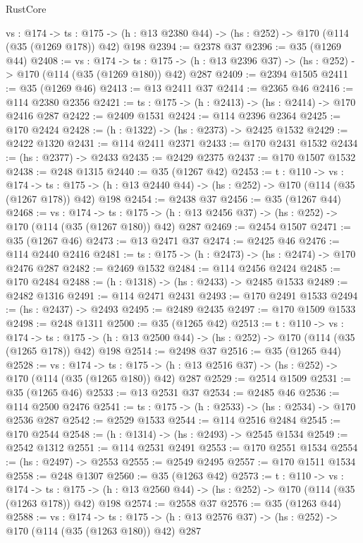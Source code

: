 \begin{lexlean}{RustCore}
\begin{coremodule}
  {vs : @174} ->
  {ts : @175} -> (h : @13 @2380 @44) -> (hs : @252) -> @170 (@114 (@35 (@1269 @178)) @42) @198
@2394 := @2378 @37
@2396 := @35 (@1269 @44)
@2408 := {vs : @174} ->
  {ts : @175} -> (h : @13 @2396 @37) -> (hs : @252) -> @170 (@114 (@35 (@1269 @180)) @42) @287
@2409 := @2394 @1505
@2411 := @35 (@1269 @46)
@2413 := @13 @2411 @37
@2414 := @2365 @46
@2416 := @114 @2380 @2356
@2421 := {ts : @175} -> (h : @2413) -> (hs : @2414) -> @170 @2416 @287
@2422 := @2409 @1531
@2424 := @114 @2396 @2364
@2425 := @170 @2424
@2428 := (h : @1322) -> (hs : @2373) -> @2425 @1532
@2429 := @2422 @1320
@2431 := @114 @2411 @2371
@2433 := @170 @2431 @1532
@2434 := (hs : @2377) -> @2433
@2435 := @2429 @2375
@2437 := @170 @1507 @1532
@2438 := @248 @1315
@2440 := @35 (@1267 @42)
@2453 := {t : @110} ->
  {vs : @174} ->
  {ts : @175} -> (h : @13 @2440 @44) -> (hs : @252) -> @170 (@114 (@35 (@1267 @178)) @42) @198
@2454 := @2438 @37
@2456 := @35 (@1267 @44)
@2468 := {vs : @174} ->
  {ts : @175} -> (h : @13 @2456 @37) -> (hs : @252) -> @170 (@114 (@35 (@1267 @180)) @42) @287
@2469 := @2454 @1507
@2471 := @35 (@1267 @46)
@2473 := @13 @2471 @37
@2474 := @2425 @46
@2476 := @114 @2440 @2416
@2481 := {ts : @175} -> (h : @2473) -> (hs : @2474) -> @170 @2476 @287
@2482 := @2469 @1532
@2484 := @114 @2456 @2424
@2485 := @170 @2484
@2488 := (h : @1318) -> (hs : @2433) -> @2485 @1533
@2489 := @2482 @1316
@2491 := @114 @2471 @2431
@2493 := @170 @2491 @1533
@2494 := (hs : @2437) -> @2493
@2495 := @2489 @2435
@2497 := @170 @1509 @1533
@2498 := @248 @1311
@2500 := @35 (@1265 @42)
@2513 := {t : @110} ->
  {vs : @174} ->
  {ts : @175} -> (h : @13 @2500 @44) -> (hs : @252) -> @170 (@114 (@35 (@1265 @178)) @42) @198
@2514 := @2498 @37
@2516 := @35 (@1265 @44)
@2528 := {vs : @174} ->
  {ts : @175} -> (h : @13 @2516 @37) -> (hs : @252) -> @170 (@114 (@35 (@1265 @180)) @42) @287
@2529 := @2514 @1509
@2531 := @35 (@1265 @46)
@2533 := @13 @2531 @37
@2534 := @2485 @46
@2536 := @114 @2500 @2476
@2541 := {ts : @175} -> (h : @2533) -> (hs : @2534) -> @170 @2536 @287
@2542 := @2529 @1533
@2544 := @114 @2516 @2484
@2545 := @170 @2544
@2548 := (h : @1314) -> (hs : @2493) -> @2545 @1534
@2549 := @2542 @1312
@2551 := @114 @2531 @2491
@2553 := @170 @2551 @1534
@2554 := (hs : @2497) -> @2553
@2555 := @2549 @2495
@2557 := @170 @1511 @1534
@2558 := @248 @1307
@2560 := @35 (@1263 @42)
@2573 := {t : @110} ->
  {vs : @174} ->
  {ts : @175} -> (h : @13 @2560 @44) -> (hs : @252) -> @170 (@114 (@35 (@1263 @178)) @42) @198
@2574 := @2558 @37
@2576 := @35 (@1263 @44)
@2588 := {vs : @174} ->
  {ts : @175} -> (h : @13 @2576 @37) -> (hs : @252) -> @170 (@114 (@35 (@1263 @180)) @42) @287

\end{coremodule}
\end{lexlean}
